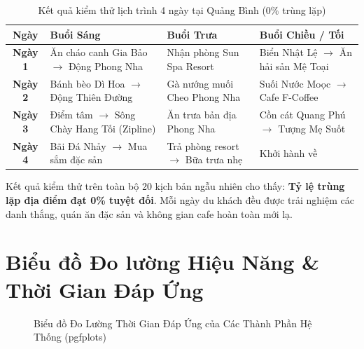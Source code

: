 \begin{table}[H]
\centering
\caption{Kết quả kiểm thử lịch trình 4 ngày tại Quảng Bình (0\% trùng lặp)}
\begin{tabular}{|c|l|l|l|}
\hline
\textbf{Ngày} & \textbf{Buổi Sáng} & \textbf{Buổi Trưa} & \textbf{Buổi Chiều / Tối} \\ \hline
\textbf{Ngày 1} & Ăn cháo canh Gia Bảo $\rightarrow$ Động Phong Nha & Nhận phòng Sun Spa Resort & Biển Nhật Lệ $\rightarrow$ Ăn hải sản Mệ Toại \\ \hline
\textbf{Ngày 2} & Bánh bèo Dì Hoa $\rightarrow$ Động Thiên Đường & Gà nướng muối Cheo Phong Nha & Suối Nước Moọc $\rightarrow$ Cafe F-Coffee \\ \hline
\textbf{Ngày 3} & Điểm tâm $\rightarrow$ Sông Chày Hang Tối (Zipline) & Ăn trưa bản địa Phong Nha & Cồn cát Quang Phú $\rightarrow$ Tượng Mẹ Suốt \\ \hline
\textbf{Ngày 4} & Bãi Đá Nhảy $\rightarrow$ Mua sắm đặc sản & Trả phòng resort $\rightarrow$ Bữa trưa nhẹ & Khởi hành về \\ \hline
\end{tabular}
\end{table}

\begin{ghinho}
Kết quả kiểm thử trên toàn bộ 20 kịch bản ngẫu nhiên cho thấy: \textbf{Tỷ lệ trùng lặp địa điểm đạt 0\% tuyệt đối}. Mỗi ngày du khách đều được trải nghiệm các danh thắng, quán ăn đặc sản và không gian cafe hoàn toàn mới lạ.
\end{ghinho}

\section{Biểu đồ Đo lường Hiệu Năng \& Thời Gian Đáp Ứng}

\begin{figure}[H]
\centering
{}
\caption{Biểu đồ Đo Lường Thời Gian Đáp Ứng của Các Thành Phần Hệ Thống (pgfplots)}
\label{fig:performance_chart}
\end{figure}

